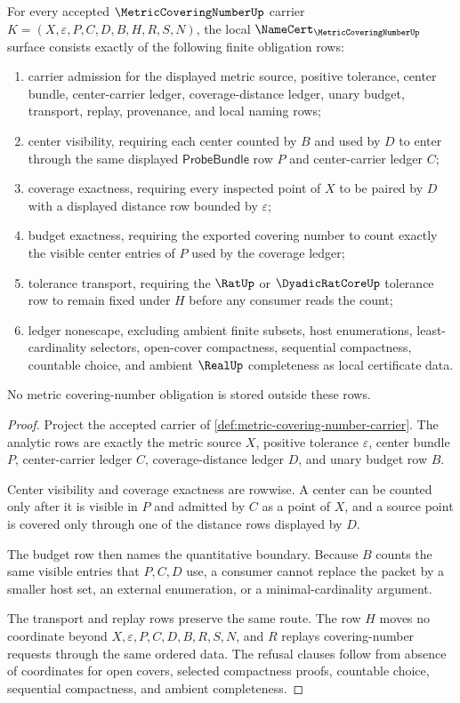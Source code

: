 \begin{theorem}
\label{thm:metric-covering-number-namecert-obligations}
For every accepted $\MetricCoveringNumberUp$ carrier $K=(X,\varepsilon,P,C,D,B,H,R,S,N)$, the local $\NameCert_{\MetricCoveringNumberUp}$ surface consists exactly of the following finite obligation rows:
\begin{enumerate}
\item carrier admission for the displayed metric source, positive tolerance, center bundle, center-carrier ledger, coverage-distance ledger, unary budget, transport, replay, provenance, and local naming rows;
\item center visibility, requiring each center counted by $B$ and used by $D$ to enter through the same displayed $\mathsf{ProbeBundle}$ row $P$ and center-carrier ledger $C$;
\item coverage exactness, requiring every inspected point of $X$ to be paired by $D$ with a displayed distance row bounded by $\varepsilon$;
\item budget exactness, requiring the exported covering number to count exactly the visible center entries of $P$ used by the coverage ledger;
\item tolerance transport, requiring the $\RatUp$ or $\DyadicRatCoreUp$ tolerance row to remain fixed under $H$ before any consumer reads the count;
\item ledger nonescape, excluding ambient finite subsets, host enumerations, least-cardinality selectors, open-cover compactness, sequential compactness, countable choice, and ambient $\RealUp$ completeness as local certificate data.
\end{enumerate}
No metric covering-number obligation is stored outside these rows.
\end{theorem}
\begin{proof}
Project the accepted carrier of \autoref{def:metric-covering-number-carrier}. The analytic rows are exactly the metric source $X$, positive tolerance $\varepsilon$, center bundle $P$, center-carrier ledger $C$, coverage-distance ledger $D$, and unary budget row $B$.

Center visibility and coverage exactness are rowwise. A center can be counted only after it is visible in $P$ and admitted by $C$ as a point of $X$, and a source point is covered only through one of the distance rows displayed by $D$.

The budget row then names the quantitative boundary. Because $B$ counts the same visible entries that $P,C,D$ use, a consumer cannot replace the packet by a smaller host set, an external enumeration, or a minimal-cardinality argument.

The transport and replay rows preserve the same route. The row $H$ moves no coordinate beyond $X,\varepsilon,P,C,D,B,R,S,N$, and $R$ replays covering-number requests through the same ordered data. The refusal clauses follow from absence of coordinates for open covers, selected compactness proofs, countable choice, sequential compactness, and ambient completeness.
\end{proof}

